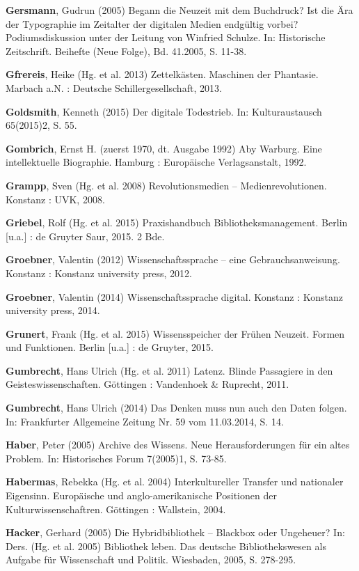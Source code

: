 \documentclass[a4paper,
fontsize=11pt,
oneside,
numbers=noperiodatend,
parskip=half-,
bibliography=totoc,
final
]{scrartcl}
\begin{document}
\textbf{Gersmann}, Gudrun (2005) Begann die Neuzeit mit dem Buchdruck?
Ist die Ära der Typographie im Zeitalter der digitalen Medien endgültig
vorbei? Podiumsdiskussion unter der Leitung von Winfried Schulze. In:
Historische Zeitschrift. Beihefte (Neue Folge), Bd. 41.2005, S. 11-38.

\textbf{Gfrereis}, Heike (Hg. et al. 2013) Zettelkästen. Maschinen der
Phantasie. Marbach a.N. : Deutsche Schillergesellschaft, 2013.

\textbf{Goldsmith}, Kenneth (2015) Der digitale Todestrieb. In:
Kulturaustausch 65(2015)2, S. 55.

\textbf{Gombrich}, Ernst H. (zuerst 1970, dt. Ausgabe 1992) Aby Warburg.
Eine intellektuelle Biographie. Hamburg : Europäische Verlagsanstalt,
1992.

\textbf{Grampp}, Sven (Hg. et al. 2008) Revolutionsmedien --
Medienrevolutionen. Konstanz : UVK, 2008.

\textbf{Griebel}, Rolf (Hg. et al. 2015) Praxishandbuch
Bibliotheksmanagement. Berlin {[}u.a.{]} : de Gruyter Saur, 2015. 2 Bde.

\textbf{Groebner}, Valentin (2012) Wissenschaftssprache -- eine
Gebrauchsanweisung. Konstanz : Konstanz university press, 2012.

\textbf{Groebner}, Valentin (2014) Wissenschaftssprache digital.
Konstanz : Konstanz university press, 2014.

\textbf{Grunert}, Frank (Hg. et al. 2015) Wissensspeicher der Frühen
Neuzeit. Formen und Funktionen. Berlin {[}u.a.{]} : de Gruyter, 2015.

\textbf{Gumbrecht}, Hans Ulrich (Hg. et al. 2011) Latenz. Blinde
Passagiere in den Geisteswissenschaften. Göttingen : Vandenhoek \&
Ruprecht, 2011.

\textbf{Gumbrecht}, Hans Ulrich (2014) Das Denken muss nun auch den
Daten folgen. In: Frankfurter Allgemeine Zeitung Nr. 59 vom 11.03.2014,
S. 14.

\textbf{Haber}, Peter (2005) Archive des Wissens. Neue Herausforderungen
für ein altes Problem. In: Historisches Forum 7(2005)1, S. 73-85.

\textbf{Habermas}, Rebekka (Hg. et al. 2004) Interkultureller Transfer
und nationaler Eigensinn. Europäische und anglo-amerikanische Positionen
der Kulturwissenschaftren. Göttingen : Wallstein, 2004.

\textbf{Hacker}, Gerhard (2005) Die Hybridbibliothek -- Blackbox oder
Ungeheuer? In: Ders. (Hg. et al. 2005) Bibliothek leben. Das deutsche
Bibliothekswesen als Aufgabe für Wissenschaft und Politik. Wiesbaden,
2005, S. 278-295.
\end{document}

